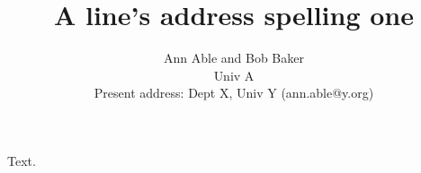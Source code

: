 \documentclass{article}
\begin{document}
\title{A line's address spelling one}
\author{Ann Able and Bob Baker\\ Univ A\\ Present address: Dept X, Univ Y (ann.able@y.org)}
\maketitle
Text.
\end{document}
